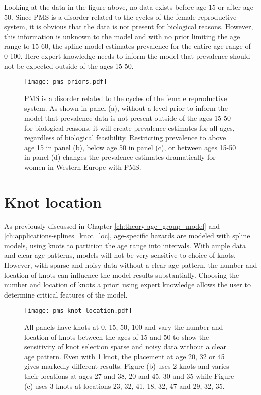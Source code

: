 Looking at the data in the figure above, no data exists before age 15 or after age 50.  Since PMS is a disorder related to the cycles of the female reproductive system, it is obvious that the data is not present for biological reasons.  However, this information is unknown to the model and with no prior limiting the age range to 15-60, the spline model estimates prevalence for the entire age range of 0-100.  Here expert knowledge needs to inform the model that prevalence should not be expected outside of the ages 15-50.

    \begin{figure}
        \begin{center}
            \texttt{[image: pms-priors.pdf]}
        \end{center}
        \caption{PMS is a disorder related to the cycles of the female reproductive system.  As shown in panel (a), without a level prior to inform the model that prevalence data is not present outside of the ages 15-50 for biological reasons, it will create prevalence estimates for all ages, regardless of biological feasibility.  Restricting prevalence to above age 15 in panel (b), below age 50 in panel (c), or between ages 15-50 in panel (d) changes the prevalence estimates dramatically for women in Western Europe with PMS.}
        \label{fig:app-prios_on_level}
    \end{figure}

\section{Knot location}
As previously discussed in Chapter \ref{ch:theory-age_group_model} and \ref{ch:applications-splines_knot_loc}, age-specific hazards are modeled with spline models, using knots to partition the age range into intervals.  With ample data and clear age patterns, models will not be very sensitive to choice of knots.  However, with sparse and noisy data without a clear age pattern, the number and location of knots can influence the model results substantially.  Choosing the number and location of knots a priori using expert knowledge allows the user to determine critical features of the model.

    \begin{figure}
        \begin{center}
            \texttt{[image: pms-knot\_location.pdf]}
        \end{center}
        \caption{All panels have knots at 0, 15, 50, 100 and vary the number and location of knots between the ages of 15 and 50 to show the sensitivity of knot selection sparse and noisy data without a clear age pattern. Even with 1 knot, the placement at age 20, 32 or 45 gives markedly different results.  Figure (b) uses 2 knots and varies their locations at ages 27 and 38, 20 and 45, 30 and 35 while Figure (c) uses 3 knots at locations {23, 32, 41}, {18, 32, 47} and {29, 32, 35}.}
        \label{fig:app-knot_loc}
    \end{figure}

